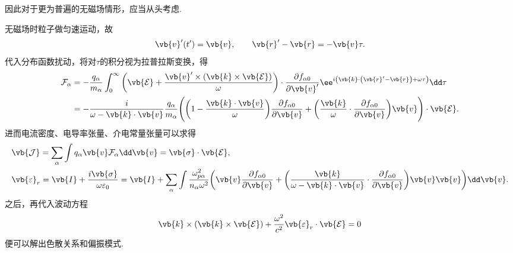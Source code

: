 因此对于更为普遍的无磁场情形，应当从头考虑.

无磁场时粒子做匀速运动，故
\begin{align*}
	\vb{v}^\prime(t^\prime)=\vb{v},\qquad \vb{r}^\prime - \vb{r}=-\vb{v}\tau.
\end{align*}
代入分布函数扰动，将对\(\tau\)的积分视为拉普拉斯变换，得
\begin{align*}
	\mathcal{F}_\alpha &= -\frac{q_\alpha}{m_\alpha}\int_{0}^{\infty}\left(\vb{\mathcal{E}}+\frac{\vb{v}^\prime\times\left(\vb{k}\times\vb{\mathcal{E}}\right)}{\omega}\right)\cdot\frac{\partial f_{\alpha0}}{\partial\vb{v}^\prime}\ee^{i\left(\vb{k}\cdot\left(\vb{r}^\prime-\vb{r}\right)+\omega\tau\right)}\dd \tau\\
	&= -\frac{i}{\omega-\vb{k}\cdot\vb{v}}\frac{q_\alpha}{m_\alpha}\Bigg(\bigg(1-\frac{\vb{k}\cdot\vb{v}}{\omega}\bigg)\frac{\partial f_{\alpha0}}{\partial\vb{v}}+\bigg(\frac{\vb{k}}{\omega}\cdot\frac{\partial f_{\alpha0}}{\partial\vb{v}}\bigg)\vb{v}\Bigg)\cdot\vb{\mathcal{E}}.
\end{align*}
进而电流密度、电导率张量、介电常量张量可以求得
\begin{align*}
	&\vb{\mathcal{J}} = \sum_\alpha\int q_\alpha\vb{v}\mathcal{F}_\alpha\dd \vb{v} = \vb{\sigma}\cdot\vb{\mathcal{E}},\\
	&\vb{\varepsilon}_r = \vb{I} + \frac{i\vb{\sigma}}{\omega\varepsilon_0} = \vb{I} + \sum_\alpha\int\frac{\omega_{p\alpha}^2}{n_\alpha\omega^2}\bigg(\vb{v}\frac{\partial f_{\alpha0}}{\partial\vb{v}}+\bigg(\frac{\vb{k}}{\omega-\vb{k}\cdot\vb{v}}\cdot\frac{\partial f_{\alpha0}}{\partial\vb{v}}\bigg)\vb{v}\vb{v}\bigg)\dd \vb{v}.
\end{align*}
之后，再代入波动方程
\begin{align*}
	\vb{k}\times\left(\vb{k}\times\vb{\mathcal{E}}\right) + \frac{\omega^2}{c^2}\vb{\varepsilon}_r\cdot\vb{\mathcal{E}} = 0
\end{align*}
便可以解出色散关系和偏振模式.

